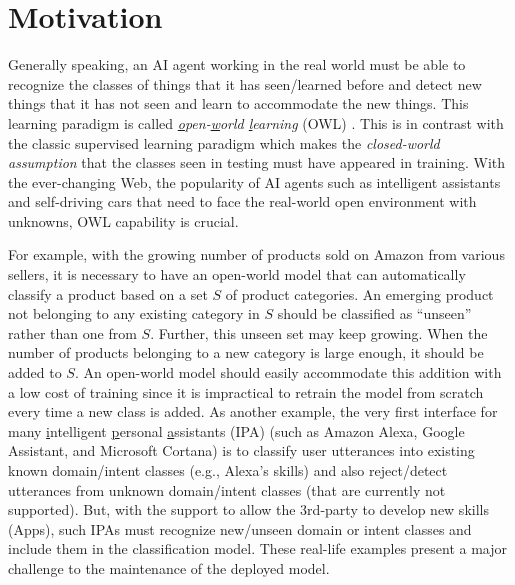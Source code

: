 \section{Motivation}
Generally speaking, an AI agent working in the real world must be able to recognize the classes of things that it has seen/learned before and detect new things that it has not seen and learn to accommodate the new things. This learning paradigm is called \textit{\underline{o}pen-\underline{w}orld \underline{l}earning} (OWL)
\cite{chen2018lifelong,bendale2015towards,fei2016learning}. 
This is in contrast with the classic supervised learning paradigm which makes the \textit{closed-world assumption} that the classes seen in testing must have appeared in training. With the ever-changing Web, the popularity of AI agents such as intelligent assistants and self-driving cars that need to face the real-world open environment with unknowns, OWL capability is crucial.

For example, with the growing number of products sold on Amazon from various sellers, it is necessary to have an open-world model that can automatically classify a product based on a set $S$ of product categories.
An emerging product not belonging to any existing category in $S$ should be classified as ``unseen'' rather than one from $S$.
Further, this unseen set may keep growing. When the number of products belonging to a new category is large enough, it should be added to $S$.
An open-world model should easily accommodate this addition with a low cost of training since it is impractical to retrain the model from scratch every time a new class is added.
As another example, the very first interface for many \underline{i}ntelligent \underline{p}ersonal \underline{a}ssistants (IPA) (such as Amazon Alexa, Google Assistant, and Microsoft Cortana) is to classify user utterances into existing known domain/intent classes (e.g., Alexa's skills) and also 
reject/detect utterances from unknown domain/intent classes (that are currently not supported).
But, with the support to allow the 3rd-party to develop new skills (Apps), such IPAs must recognize new/unseen domain or intent classes and include them in the classification model. These real-life examples present a major challenge to the maintenance of the deployed model.

